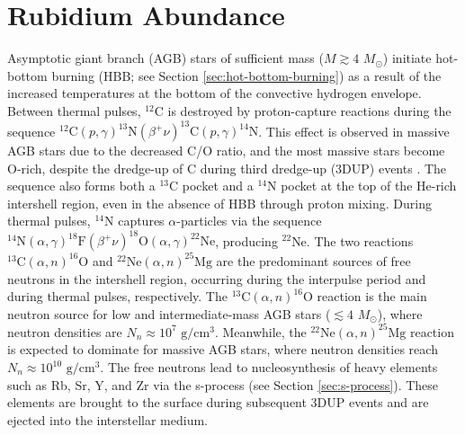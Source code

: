 \section{Rubidium Abundance} \label{sec:Rb_Abundance}






Asymptotic giant branch (AGB) stars of sufficient mass ($M \gtrsim 4$ $M_{\odot}$) initiate hot-bottom burning (HBB; see Section \ref{sec:hot-bottom-burning}) as a result of the increased temperatures at the bottom of the convective hydrogen envelope. Between thermal pulses, $^{12}$C is destroyed by proton-capture reactions during the sequence $^{12}\mathrm{C}(p,\gamma)^{13}\mathrm{N}(\beta^{+}\nu)^{13}\mathrm{C}(p,\gamma)^{14}\mathrm{N}$. This effect is observed in massive AGB stars due to the decreased C/O ratio, and the most massive stars become O-rich, despite the dredge-up of C during third dredge-up (3DUP) events \cite{Garcia2006}. The sequence also forms both a $^{13}$C pocket and a $^{14}$N pocket at the top of the He-rich intershell region, even in the absence of HBB through proton mixing. During thermal pulses, $^{14}$N captures $\alpha$-particles via the sequence $^{14}\mathrm{N}(\alpha,\gamma)^{18}\mathrm{F}(\beta^{+}\nu)^{18}\mathrm{O}(\alpha,\gamma)^{22}\mathrm{Ne}$, producing $^{22}$Ne. The two reactions $^{13}\mathrm{C}(\alpha,n)^{16}\mathrm{O}$ and $^{22}\mathrm{Ne}(\alpha,n)^{25}\mathrm{Mg}$ are the predominant sources of free neutrons in the intershell region, occurring during the interpulse period and during thermal pulses, respectively. The $^{13}\mathrm{C}(\alpha,n)^{16}\mathrm{O}$ reaction is the main neutron source for low and intermediate-mass AGB stars ($\lesssim 4$ $M_{\odot}$), where neutron densities are $N_{n} \approx 10^{7}$ $\mathrm{g}/\mathrm{cm}^{3}$. Meanwhile, the $^{22}\mathrm{Ne}(\alpha,n)^{25}\mathrm{Mg}$ reaction is expected to dominate for massive AGB stars, where neutron densities reach $N_{n} \approx 10^{10}$ $\mathrm{g}/\mathrm{cm}^{3}$. The free neutrons lead to nucleosynthesis of heavy elements such as Rb, Sr, Y, and Zr via the s-process (see Section \ref{sec:s-process}). These elements are brought to the surface during subsequent 3DUP events and are ejected into the interstellar medium. 

